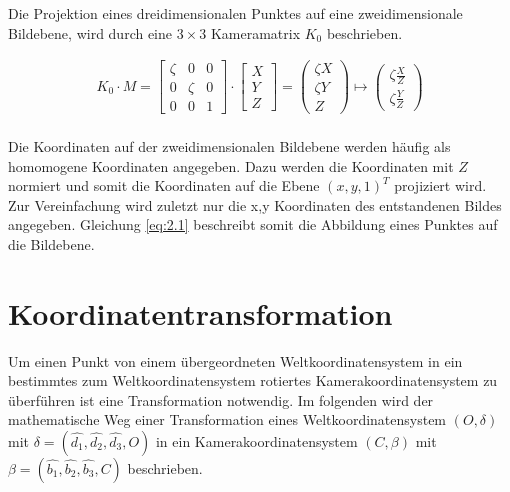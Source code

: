 Die Projektion eines dreidimensionalen Punktes auf eine zweidimensionale Bildebene, wird durch eine $3 \times 3$ Kameramatrix $K_0$ beschrieben. 

\begin{gather}
	K_0\cdot M =
	\begin{bmatrix}
		\zeta&0&0\\
		0&\zeta&0\\
		0&0&1
	\end{bmatrix}
	\cdot
	\begin{bmatrix}
		X\\Y\\Z
	\end{bmatrix}
	=
	\begin{pmatrix}
		\zeta X\\ \zeta Y\\ Z
	\end{pmatrix}
	\mapsto
	\begin{pmatrix}
		\zeta \frac{X}{Z}\\ \zeta \frac{Y}{Z}
	\end{pmatrix}
	\label{eq:2.1}
\end{gather}\\

Die Koordinaten auf der zweidimensionalen Bildebene werden häufig als homomogene Koordinaten angegeben. Dazu werden die Koordinaten mit $Z$ normiert und somit die Koordinaten auf die Ebene $(x,y,1)^T$ projiziert wird. Zur Vereinfachung wird zuletzt nur die x,y Koordinaten des entstandenen Bildes angegeben. Gleichung \ref{eq:2.1} beschreibt somit die Abbildung eines Punktes auf die Bildebene.

\section{Koordinatentransformation}

Um einen Punkt von einem übergeordneten Weltkoordinatensystem in ein bestimmtes zum Weltkoordinatensystem rotiertes Kamerakoordinatensystem zu überführen ist eine Transformation notwendig. Im folgenden wird der mathematische Weg einer Transformation eines Weltkoordinatensystem $(O,\delta)$ mit $\delta = (\hat{d_1},\hat{d_2},\hat{d_3},O)$ in ein Kamerakoordinatensystem $(C,\beta)$ mit $\beta = (\hat{b_1},\hat{b_2},\hat{b_3},C)$ beschrieben.



